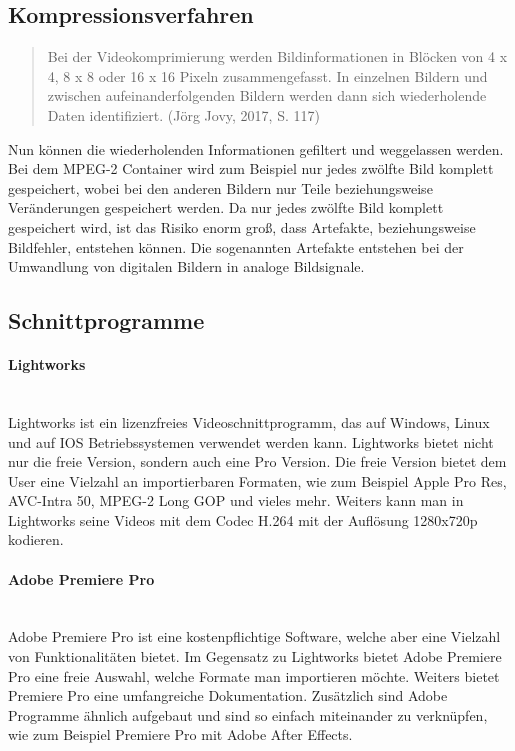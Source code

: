 \subsection{Kompressionsverfahren}
\begin{quote}
Bei der Videokomprimierung werden Bildinformationen in Blöcken von 4 x 4, 8 x 8 oder 16 x 16 Pixeln zusammengefasst. In einzelnen Bildern und zwischen aufeinanderfolgenden Bildern werden dann sich wiederholende Daten identifiziert. (Jörg Jovy, 2017, S. 117)\end{quote}
Nun können die wiederholenden Informationen gefiltert und weggelassen werden. Bei dem MPEG-2 Container wird zum Beispiel nur jedes zwölfte Bild komplett gespeichert, wobei bei den anderen Bildern nur Teile beziehungsweise Veränderungen gespeichert werden. Da nur jedes zwölfte Bild komplett gespeichert wird, ist das Risiko enorm groß, dass Artefakte, beziehungsweise Bildfehler, entstehen können. Die sogenannten Artefakte entstehen bei der Umwandlung von digitalen Bildern in analoge Bildsignale.\citep{kompression}
\subsection{Schnittprogramme}
\paragraph{Lightworks}
\leavevmode \\
Lightworks ist ein lizenzfreies Videoschnittprogramm, das auf Windows, Linux und auf IOS Betriebssystemen verwendet werden kann. Lightworks bietet nicht nur die freie Version, sondern auch eine Pro Version. Die freie Version bietet dem User eine Vielzahl an importierbaren Formaten, wie zum Beispiel Apple Pro Res, AVC-Intra 50, MPEG-2 Long GOP und vieles mehr. Weiters kann man in Lightworks seine Videos mit dem Codec H.264 mit der Auflösung 1280x720p kodieren.\citep{lightworks}\citep{lightworksZwei}
\paragraph{Adobe Premiere Pro}
\leavevmode \\
Adobe Premiere Pro ist eine kostenpflichtige Software, welche aber eine Vielzahl von Funktionalitäten bietet. Im Gegensatz zu Lightworks bietet Adobe Premiere Pro eine freie Auswahl, welche Formate man importieren möchte. Weiters bietet Premiere Pro eine umfangreiche Dokumentation. Zusätzlich sind Adobe Programme ähnlich aufgebaut und sind so einfach miteinander zu verknüpfen, wie zum Beispiel Premiere Pro mit Adobe After Effects.\citep{premiere}
